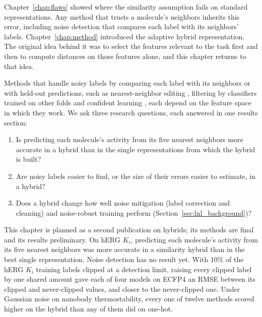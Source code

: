 Chapter~\ref{chap:flaws} showed where the similarity assumption fails on standard representations. Any method that trusts a molecule's neighbors inherits this error, including noise detection that compares each label with its neighbors' labels. Chapter~\ref{chap:method} introduced the adaptive hybrid representation. The original idea behind it was to select the features relevant to the task first and then to compute distances on those features alone, and this chapter returns to that idea.

Methods that handle noisy labels by comparing each label with its neighbors or with held-out predictions, such as nearest-neighbor editing \citep{Wilson1972}, filtering by classifiers trained on other folds \citep{Brodley1999} and confident learning \citep{Northcutt2021}, each depend on the feature space in which they work. We ask three research questions, each answered in one results section:
\begin{enumerate}
    \item Is predicting each molecule's activity from its five nearest neighbors more accurate in a hybrid than in the single representations from which the hybrid is built?
    \item Are noisy labels easier to find, or the size of their errors easier to estimate, in a hybrid?
    \item Does a hybrid change how well noise mitigation (label correction and cleaning) and noise-robust training perform (Section~\ref{sec:lnl_background})?
\end{enumerate}

This chapter is planned as a second publication on hybrids; its methods are final and its results preliminary. On hERG $K_i$, predicting each molecule's activity from its five nearest neighbors was more accurate in a similarity hybrid than in the best single representation. Noise detection has no result yet. With 10\% of the hERG $K_i$ training labels clipped at a detection limit, raising every clipped label by one shared amount gave each of four models on ECFP4 an RMSE between its clipped and never-clipped values, and closer to the never-clipped one. Under Gaussian noise on nanobody thermostability, every one of twelve methods scored higher on the hybrid than any of them did on one-hot.



